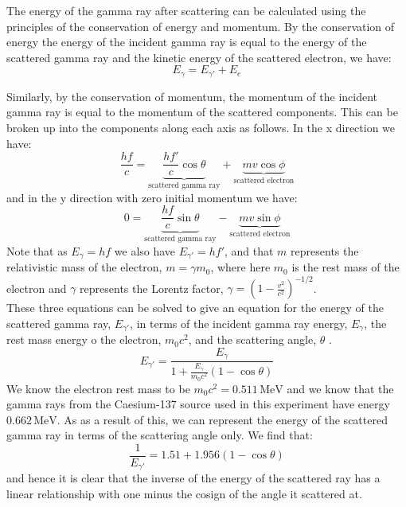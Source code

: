 \documentclass[%
reprint,
amsmath,amssymb,
aps,
]{revtex4-2}
\begin{document}
			The energy of the gamma ray after scattering can be calculated using the principles of the conservation of energy and momentum. By the conservation of energy the energy of the incident gamma ray  is equal to the energy of the scattered gamma ray and the kinetic energy of the scattered electron, we have:
			\begin{equation}
				E_\gamma = E_{\gamma'} + E_e
			\end{equation}
			
			Similarly, by the conservation of momentum, the momentum of the incident gamma ray is equal to the momentum of the scattered components. This can be broken up into the components along each axis as follows. In the x direction we have:
			\begin{equation}
				\frac{hf}{c} = \underbrace{\frac{hf'}{c} \cos{\theta}}_\text{scattered gamma ray} + \underbrace{mv \cos{\phi}}_\text{scattered electron}
			\end{equation}and in the y direction with zero initial momentum we have:
			\begin{equation}
				0 = \underbrace{\frac{hf}{c} \sin{\theta}}_\text{scattered gamma ray} - \underbrace{mv \sin{\phi}}_\text{scattered electron}
			\end{equation}Note that as $E_\gamma = hf$ we also have $E_{\gamma'} = hf'$, and that $m$ represents the relativistic mass of the electron, $m = \gamma m_0$, where here $m_0$ is the rest mass of the electron and $\gamma$ represents the Lorentz factor, $\gamma = \left( 1 - \frac{v^2}{c^2} \right)^{-1/2}$.\\
			
			These three equations can be solved to give an equation for the energy of the scattered gamma ray, $E_{\gamma'}$, in terms of the incident gamma ray energy, $E_\gamma$, the rest mass energy o the electron, $m_0 c^2$, and the scattering angle, $\theta$ \cite{manual1}.
			\begin{equation}
				E_{\gamma'} = \frac{E_\gamma}{1 + \frac{E_\gamma}{m_0 c^2} \left( 1 - \cos{\theta} \right)}
			\end{equation}We know the electron rest mass to be $m_0 c^2 = 0.511 \,\text{MeV}$ and we know that the gamma rays from the Caesium-137 source used in this experiment have energy $0.662 \,\text{MeV}$. As as a result of this, we can represent the energy of the scattered gamma ray in terms of the scattering angle only. We find that:
			\begin{equation}
				\frac{1}{E_{\gamma'}} = 1.51 + 1.956 \left( 1 - \cos{\theta} \right)
				\label{eq:inverseGammaEnergyTheory}
			\end{equation}and hence it is clear that the inverse of the energy of the scattered ray has a linear relationship with one minus the cosign of the angle it scattered at.\\
			
\end{document}

